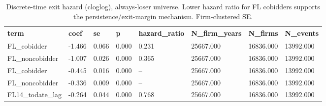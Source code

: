 \begin{table}[htbp]\centering
\caption{Discrete-time exit hazard (cloglog), always-loser universe. Lower hazard ratio for FL cobidders supports the persistence/exit-margin mechanism. Firm-clustered SE.}
\label{tab:B_hazard}
\begin{tabular}{llllllll}
\toprule
term & coef & se & p & hazard\_ratio & N\_firm\_years & N\_firms & N\_events
\\ \midrule
FL\_cobidder & -1.466 & 0.066 & 0.000 & 0.231 & 25667.000 & 16836.000 & 13992.000 \\
FL\_noncobidder & -1.007 & 0.026 & 0.000 & 0.365 & 25667.000 & 16836.000 & 13992.000 \\
FL\_cobidder & -0.445 & 0.016 & 0.000 &   -- & 25667.000 & 16836.000 & 13992.000 \\
FL\_noncobidder & -0.336 & 0.009 & 0.000 &   -- & 25667.000 & 16836.000 & 13992.000 \\
FL14\_todate\_lag & -0.264 & 0.044 & 0.000 & 0.768 & 25667.000 & 16836.000 & 13992.000 \\
\bottomrule
\end{tabular}
\end{table}
